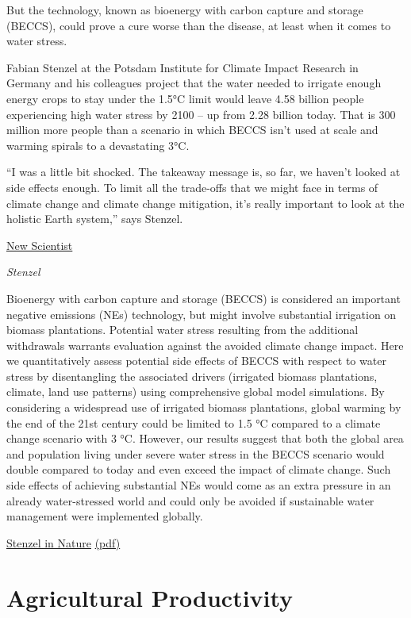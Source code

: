 \documentclass[
]{book}
\begin{document}
But the technology, known as bioenergy with carbon capture and storage (BECCS), could prove a cure worse than the disease, at least when it comes to water stress.

Fabian Stenzel at the Potsdam Institute for Climate Impact Research in Germany and his colleagues project that the water needed to irrigate enough energy crops to stay under the 1.5°C limit would leave 4.58 billion people experiencing high water stress by 2100 -- up from 2.28 billion today. That is 300 million more people than a scenario in which BECCS isn't used at scale and warming spirals to a devastating 3°C.

``I was a little bit shocked. The takeaway message is, so far, we haven't looked at side effects enough. To limit all the trade-offs that we might face in terms of climate change and climate change mitigation, it's really important to look at the holistic Earth system,'' says Stenzel.

\href{https://www.newscientist.com/article/2270227-carbon-negative-crops-may-mean-water-shortages-for-4-5-billion-people/\#ixzz6q2AZOybe}{New Scientist}

\emph{Stenzel}

Bioenergy with carbon capture and storage (BECCS) is considered an important negative
emissions (NEs) technology, but might involve substantial irrigation on biomass plantations.
Potential water stress resulting from the additional withdrawals warrants evaluation against
the avoided climate change impact. Here we quantitatively assess potential side effects of
BECCS with respect to water stress by disentangling the associated drivers (irrigated biomass
plantations, climate, land use patterns) using comprehensive global model simulations.
By considering a widespread use of irrigated biomass plantations, global warming by the
end of the 21st century could be limited to 1.5 °C compared to a climate change scenario with
3 °C. However, our results suggest that both the global area and population living under
severe water stress in the BECCS scenario would double compared to today and even exceed
the impact of climate change. Such side effects of achieving substantial NEs would come as
an extra pressure in an already water-stressed world and could only be avoided if sustainable
water management were implemented globally.

\href{https://www.nature.com/articles/s41467-021-21640-3}{Stenzel in Nature}
\href{pdf/Stenzel_2021_Biomass_Plantation_Water_Stress.pdf}{(pdf)}

\hypertarget{agricultural-productivity}{%
\section{Agricultural Productivity}\label{agricultural-productivity}}
\end{document}
